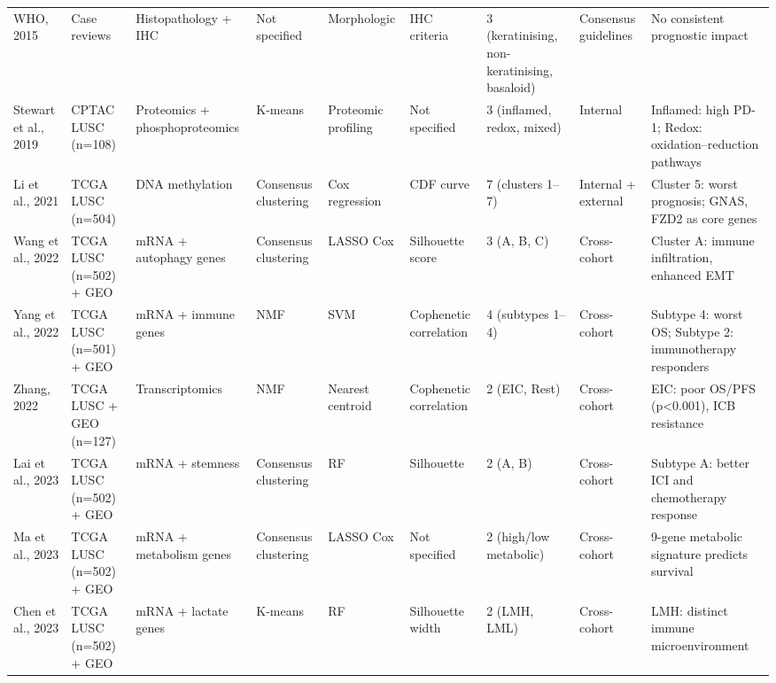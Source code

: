 \begin{longtable}{
p{1.0cm}
p{1.5cm}
p{1.3cm}
p{1.1cm}
p{1.2cm}
p{1.0cm}
p{1.4cm}
p{1.3cm}
p{2.8cm}
}
WHO, 2015 \parencite{Travis2015}
& Case reviews
& Histopathology + IHC
& Not specified
& Morphologic
& IHC criteria
& 3 (keratinising, non-keratinising, basaloid)
& Consensus guidelines
& No consistent prognostic impact \\[3pt]

Stewart et al., 2019 \parencite{Stewart2019}
& CPTAC LUSC (n=108)
& Proteomics + phosphoproteomics
& K-means
& Proteomic profiling
& Not specified
& 3 (inflamed, redox, mixed)
& Internal
& Inflamed: high PD-1; Redox: oxidation--reduction pathways \\[3pt]

Li et al., 2021 \parencite{Li2021methylation}
& TCGA LUSC (n=504)
& DNA methylation
& Consensus clustering
& Cox regression
& CDF curve
& 7 (clusters 1--7)
& Internal + external
& Cluster 5: worst prognosis; GNAS, FZD2 as core genes \\[3pt]

Wang et al., 2022 \parencite{Wang2022autophagy}
& TCGA LUSC (n=502) + GEO
& mRNA + autophagy genes
& Consensus clustering
& LASSO Cox
& Silhouette score
& 3 (A, B, C)
& Cross-cohort
& Cluster A: immune infiltration, enhanced EMT \\[3pt]

Yang et al., 2022 \parencite{Yang2022immune}
& TCGA LUSC (n=501) + GEO
& mRNA + immune genes
& NMF
& SVM
& Cophenetic correlation
& 4 (subtypes 1--4)
& Cross-cohort
& Subtype 4: worst OS; Subtype 2: immunotherapy responders \\[3pt]

Zhang, 2022 \parencite{Zhang2022}
& TCGA LUSC + GEO (n=127)
& Transcriptomics
& NMF
& Nearest centroid
& Cophenetic correlation
& 2 (EIC, Rest)
& Cross-cohort
& EIC: poor OS/PFS (p<0.001), ICB resistance \\[3pt]

Lai et al., 2023 \parencite{Lai2023stemness}
& TCGA LUSC (n=502) + GEO
& mRNA + stemness
& Consensus clustering
& RF
& Silhouette
& 2 (A, B)
& Cross-cohort
& Subtype A: better ICI and chemotherapy response \\[3pt]

Ma et al., 2023 \parencite{Ma2023metabolism}
& TCGA LUSC (n=502) + GEO
& mRNA + metabolism genes
& Consensus clustering
& LASSO Cox
& Not specified
& 2 (high/low metabolic)
& Cross-cohort
& 9-gene metabolic signature predicts survival \\[3pt]

Chen et al., 2023 \parencite{Chen2023lactate}
& TCGA LUSC (n=502) + GEO
& mRNA + lactate genes
& K-means
& RF
& Silhouette width
& 2 (LMH, LML)
& Cross-cohort
& LMH: distinct immune microenvironment \\[3pt]


\end{longtable}
